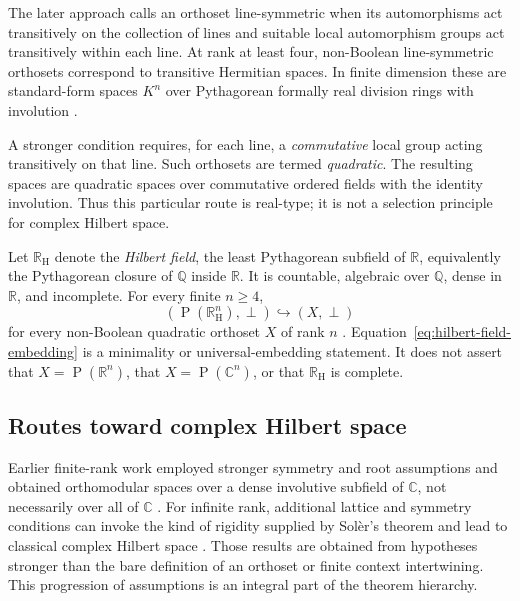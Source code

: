 \documentclass[
  aps,
  pra,
  twocolumn,
  amsmath,
  amssymb,
  longbibliography,
  nofootinbib,
  floatfix
]{revtex4-2}
\newcommand{\Proj}{\operatorname{P}}
\newcommand{\RH}{\mathbb R_{\mathrm H}}
\begin{document}
The later approach calls an orthoset line-symmetric when its automorphisms act
transitively on the collection of lines and suitable local automorphism groups
act transitively within each line.  At rank at least four, non-Boolean
line-symmetric orthosets correspond to transitive Hermitian spaces.  In finite
dimension these are standard-form spaces $K^n$ over Pythagorean formally real
division rings with involution
\cite{KorbelarPasekaVetterlein2025}.

A stronger condition requires, for each line, a \emph{commutative} local group
acting transitively on that line.  Such orthosets are termed
\emph{quadratic}.  The resulting spaces are quadratic spaces over commutative
ordered fields with the identity involution.  Thus this particular route is
real-type; it is not a selection principle for complex Hilbert space.

Let $\RH$ denote the \emph{Hilbert field}, the least Pythagorean subfield of
$\mathbb R$, equivalently the Pythagorean closure of $\mathbb Q$ inside
$\mathbb R$.  It is countable, algebraic over $\mathbb Q$, dense in
$\mathbb R$, and incomplete.  For every finite $n\ge4$,
\begin{equation}
  (\Proj(\RH^n),\perp)
  \hookrightarrow
  (X,\perp)
  \label{eq:hilbert-field-embedding}
\end{equation}
for every non-Boolean quadratic orthoset $X$ of rank $n$
\cite{KorbelarPasekaVetterlein2025}.  Equation~\eqref{eq:hilbert-field-embedding}
is a minimality or universal-embedding statement.  It does not assert that
$X=\Proj(\mathbb R^n)$, that $X=\Proj(\mathbb C^n)$, or that $\RH$ is complete.

\subsection{Routes toward complex Hilbert space}

Earlier finite-rank work employed stronger symmetry and root assumptions and
obtained orthomodular spaces over a dense involutive subfield of $\mathbb C$,
not necessarily over all of $\mathbb C$ \cite{Vetterlein2019FiniteComplex}.
For infinite rank, additional lattice and symmetry conditions can invoke the
kind of rigidity supplied by Sol\`er's theorem and lead to classical complex
Hilbert space \cite{Soler1995,Holland1995Soler,
Vetterlein2021InfiniteComplex}.  Those results are
obtained from hypotheses stronger than the bare definition of an orthoset or
finite context intertwining.  This progression of assumptions is an integral
part of the theorem hierarchy.
\end{document}
